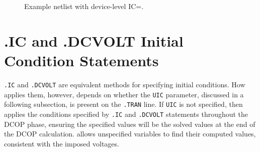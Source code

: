 \begin{figure}[htbp]
\begin{centering}
\caption[Example netlist with device-level IC=.]{Example netlist with device-level IC=.\label{IC_Netlist_1}}
\end{centering}
\end{figure}

\newpage
\section{.IC and .DCVOLT Initial Condition Statements}
\label{IC_statement_spec}


\texttt{.IC} and \texttt{.DCVOLT} are equivalent methods for
specifying initial conditions.  How \Xyce{} applies them, however,
depends on whether the \texttt{UIC} parameter, discussed in a following
subsection, is present on the \texttt{.TRAN} line.  
If \texttt{UIC} is not specified, then \Xyce{}
applies the conditions specified by \texttt{.IC} and
\texttt{.DCVOLT} statements throughout the DCOP phase, ensuring the
specified values will be the solved values at the end of the DCOP
calculation.  \Xyce{} allows unspecified variables to find their
computed values, consistent with the imposed voltages.


